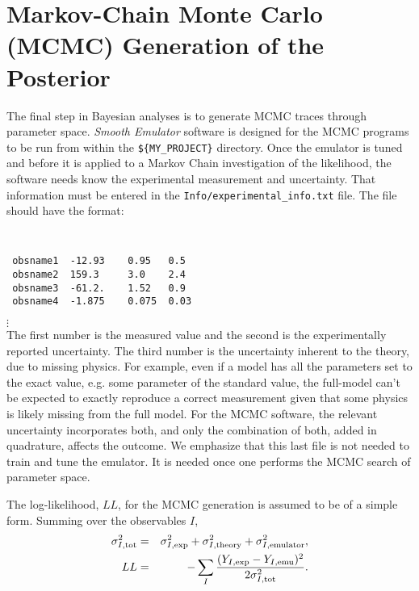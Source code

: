 \documentclass[UserManual.tex]{subfiles}
\begin{document}
\setcounter{section}{6}
\section{Markov-Chain Monte Carlo (MCMC) Generation of the Posterior}\label{sec:mcmc}

The final step in Bayesian analyses is to generate MCMC traces through parameter space. {\it Smooth Emulator} software is designed for the MCMC programs to be run from within the {\tt \$\{MY\_PROJECT\}} directory. Once the emulator is tuned and before it is applied to a Markov Chain investigation of the likelihood, the software needs know the experimental measurement and uncertainty. That information must be entered in the {\tt Info/experimental\_info.txt} file. The file should have the format:
{\tt
\begin{verbatim}
 obsname1  -12.93    0.95   0.5
 obsname2  159.3     3.0    2.4
 obsname3  -61.2.    1.52   0.9
 obsname4  -1.875    0.075  0.03
\end{verbatim}}
\vspace*{-16pt}
 \hspace*{28pt}$\vdots$\\
The first number is the measured value and the second is the experimentally reported uncertainty. The third number is the uncertainty inherent to the theory, due to missing physics. For example, even if a model has all the parameters set to the exact value, e.g. some parameter of the standard value, the full-model can't be expected to exactly reproduce a correct measurement given that some physics is likely missing from the full model. For the MCMC software, the relevant uncertainty incorporates both, and only the combination of both, added in quadrature, affects the outcome. We emphasize that this last file is not needed to train and tune the emulator. It is needed once one performs the MCMC search of parameter space.

The log-likelihood, $LL$, for the MCMC generation is assumed to be of a simple form. Summing over the observables $I$,
\begin{eqnarray*}
\sigma_{I,{\rm tot}}^{2}&=&\sigma_{I,{\rm exp}}^2+\sigma_{I,{\rm theory}}^2+\sigma_{I,{\rm emulator}}^2,\\
LL&=&-\sum_{I}\frac{(Y_{I,{\rm exp}}-Y_{I,{\rm emu}})^{2}}{2\sigma_{I,{\rm tot}}^{2}}.
\end{eqnarray*}
\end{document}

